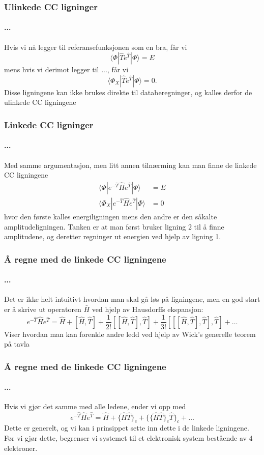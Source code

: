 \documentclass[norsk,a4paper,12pt]{beamer}
\begin{document}
  \begin{frame}
    \frametitle{Ulinkede CC ligninger}
    \framesubtitle{...}
    Hvis vi nå legger til referansefunksjonen som en bra, får vi
    \begin{equation}
    \langle\Phi|\hat{T}e^{\hat{T}}|\Phi\rangle=E
    \end{equation}
    mens hvis vi derimot legger til ..., får vi
    \begin{equation}
    \langle\Phi_X|\hat{T}e^{\hat{T}}|\Phi\rangle=0.
    \end{equation}
    Disse ligningene kan ikke brukes direkte til databeregninger, og kalles derfor de ulinkede CC ligningene
  \end{frame}
  \begin{frame}
    \frametitle{Linkede CC ligninger}
    \framesubtitle{...}
    Med samme argumentasjon, men litt annen tilnærming kan man finne de linkede CC ligningene
    \begin{align}
    \langle\Phi|e^{-\hat{T}}\hat{H}e^{\hat{T}}|\Phi\rangle&=E\\
    \langle\Phi_X|e^{-\hat{T}}\hat{H}e^{\hat{T}}|\Phi\rangle&=0
    \end{align}
    hvor den første kalles energiligningen mens den andre er den såkalte amplitudeligningen. Tanken er at man først bruker ligning 2 til å finne amplitudene, og deretter regninger ut energien ved hjelp av ligning 1.
  \end{frame}
  \begin{frame}
    \frametitle{Å regne med de linkede CC ligningene}
    \framesubtitle{...}
    Det er ikke helt intuitivt hvordan man skal gå løs på ligningene, men en god start er å skrive ut operatoren $\bar{H}$ ved hjelp av Hausdorffs ekspansjon:
    \begin{equation*}
    e^{-\hat{T}}\hat{H}e^{\hat{T}}=\hat{H}+[\hat{H},\hat{T}]+\frac{1}{2!}[[\hat{H},\hat{T}],\hat{T}]+\frac{1}{3!}[[[\hat{H},\hat{T}],\hat{T}],\hat{T}]+\hdots
    \end{equation*}
    Viser hvordan man kan forenkle andre ledd ved hjelp av Wick's generelle teorem på tavla
  \end{frame}
  \begin{frame}
    \frametitle{Å regne med de linkede CC ligningene}
    \framesubtitle{...}
    Hvis vi gjør det samme med alle ledene, ender vi opp med
    \begin{equation*}
    e^{-\hat{T}}\hat{H}e^{\hat{T}}=\hat{H}+\{\hat{H}\hat{T}\}_c+\{\{\hat{H}\hat{T}\}_c\hat{T}\}_c+\hdots
    \end{equation*}
    Dette er generelt, og vi kan i prinsippet sette inn dette i de linkede ligningene. Før vi gjør dette, begrenser vi systemet til et elektronisk system bestående av 4 elektroner. 
  \end{frame}
\end{document}
